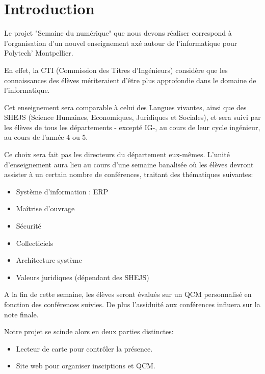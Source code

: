 \chapter{Introduction}
Le projet "Semaine du numérique" que nous devons réaliser correspond à l’organisation
d'un nouvel enseignement axé autour de l'informatique pour Polytech' Montpellier.

En effet, la CTI (Commission des Titres d'Ingénieurs) considère que les 
connaissances des élèves mériteraient d'être plus approfondie dans le domaine 
de l'informatique.

Cet enseignement sera comparable à celui des Langues vivantes, ainsi que des
SHEJS (Science Humaines, Economiques, Juridiques et Sociales), et sera suivi
par les élèves de tous les départements - excepté IG-, au cours de leur cycle 
ingénieur, au cours de l'année 4 ou 5.

Ce choix sera fait pas les directeurs du département eux-mêmes. L'unité 
d'enseignement aura lieu au cours d'une semaine banalisée où les élèves 
devront assister à un certain nombre de conférences, traitant des thématiques 
suivantes:

\begin{itemize}
\item Système d’information : ERP
\item Maîtrise d’ouvrage
\item Sécurité
\item Collecticiels
\item Architecture système
\item Valeurs juridiques (dépendant des SHEJS)
\end{itemize}

A la fin de cette semaine, les élèves seront évalués sur un QCM personnalisé 
en fonction des conférences suivies. De plus l'assiduité aux conférences influera
sur la note finale.

Notre projet se scinde alors en deux parties distinctes:
\begin{itemize}
\item Lecteur de carte pour contrôler la présence.
\item Site web pour organiser insciptions et QCM.
\end{itemize}
